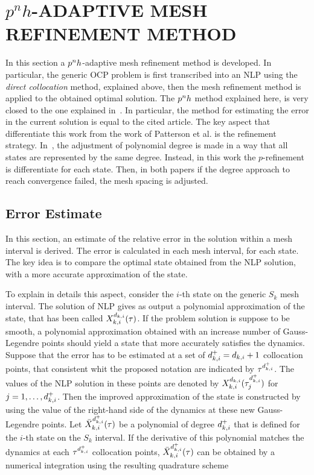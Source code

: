 \section*{$p^n h$-ADAPTIVE MESH REFINEMENT METHOD}

In this section a $p^{n}h$-adaptive mesh refinement method is developed. In particular, the generic OCP problem is first transcribed into an NLP using the \emph{direct collocation} method, explained above, then the mesh refinement method is applied to the obtained optimal solution.
The $p^{n}h$ method explained here, is very closed to the one explained in~\cite{Patterson:OCAM:2015}. In particular, the method for estimating the error in the current solution is equal to the cited article. The key aspect that differentiate this work from the  work of Patterson et al. is the refinement strategy.
In~\cite{Patterson:OCAM:2015}, the adjustment of polynomial degree is made in a way that all states are represented by the same degree. Instead, in this work the $p$-refinement is differentiate for each state. Then, in both papers if the degree approach to reach convergence failed, the mesh spacing is adjusted.


\subsection*{Error Estimate}

In this section, an estimate of the relative error in the solution within a mesh interval is derived. The error is calculated in each mesh interval, for each state.
The key idea is to compare the optimal state obtained from the NLP solution, with a more accurate approximation of the state.

To explain in details this aspect, consider the $i$-th state on the generic $S_k$ mesh interval.
The solution of NLP gives as output a polynomial approximation of the state, that has been called $X_{k,i}^{d_{k,i}} (\tau)$.
If the problem solution is suppose to be smooth, a polynomial approximation obtained with an increase number of Gauss-Legendre points should yield a state that more accurately satisfies the dynamics.
Suppose that the error has to be estimated at a set of  $d_{k,i}^{+} = d_{k,i} + 1$ collocation points, that consistent whit the proposed notation are indicated by $\tau^{{d}_{k,i}^{+}}$.
The values of the NLP solution in these points are denoted by $X_{k,i}^{d_{k,i}} (\tau^{{d}_{k,i}^{+}}_j)$ for $j = 1, \dots, d_{k,i}^{+}$.
Then the improved approximation of the state is constructed by using the value of the right-hand side of the dynamics at these new Gauss-Legendre points.
Let $\bar{X}_{k,i}^{d_{k,i}^{+}} (\tau)$ be a polynomial of degree $d_{k,i}^{+}$ that is defined for the $i$-th state on the $S_k$ interval. If the derivative of this polynomial matches the dynamics at each $\tau^{{d}_{k,i}^{+}}$ collocation points, $\bar{X}_{k,i}^{d_{k,i}^{+}} (\tau)$ can be obtained by a numerical integration using the resulting quadrature scheme

